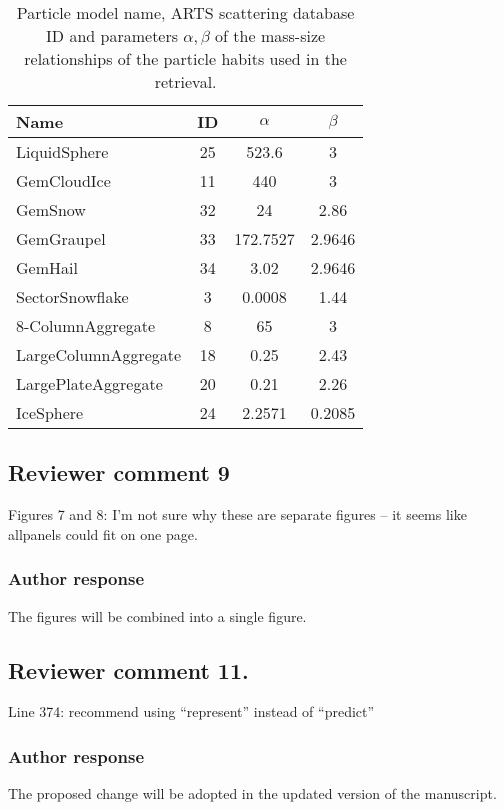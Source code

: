 \documentclass[11pt]{scrartcl}
\begin{document}
\begin{table}
  \centering
  \caption{Particle model name, ARTS scattering database ID and parameters
    $\alpha, \beta$ of the mass-size relationships of the particle habits used
    in the retrieval.}
  \begin{tabular}{l|c|c|c}
    Name & ID & $\alpha$ & $\beta$ \\
    \hline
    LiquidSphere & 25  & 523.6    & 3 \\
    GemCloudIce  & 11  & 440      & 3 \\
    GemSnow      & 32  & 24       & 2.86 \\
    GemGraupel   & 33  & 172.7527 & 2.9646 \\
    GemHail      & 34  & 3.02     & 2.9646 \\
    \hline
    SectorSnowflake      &  3  & 0.0008 & 1.44 \\
    8-ColumnAggregate    &  8  & 65     & 3 \\
    LargeColumnAggregate &  18 & 0.25   & 2.43 \\
    LargePlateAggregate  &  20 & 0.21   & 2.26 \\
    IceSphere            &  24 & 2.2571 & 0.2085 \\
  \end{tabular}
  \label{tab:particle_properties}
\end{table}


\subsection*{Reviewer comment 9}

Figures 7 and 8:  I’m not sure why these are separate figures – it seems like allpanels could fit on one page.

\subsubsection*{Author response}

The figures will be combined into a single figure.

\subsection*{Reviewer comment 11.}
 Line 374: recommend using “represent” instead of “predict”

\subsubsection*{Author response}
The proposed change will be adopted in the updated version of the manuscript.
\end{document}
